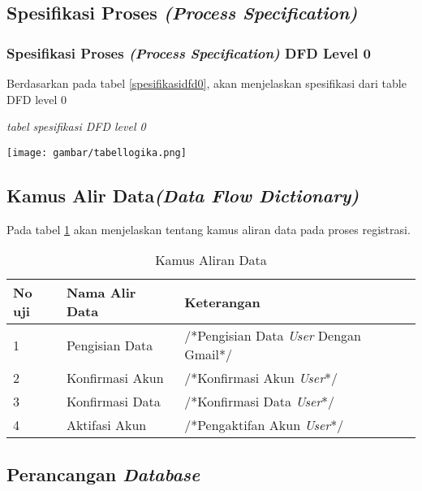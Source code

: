 \subsection{Spesifikasi Proses \textit{(Process Specification)}}
\subsubsection{Spesifikasi Proses \textit{(Process Specification)} DFD Level 0}
\par
Berdasarkan pada tabel \ref{spesifikasidfd0}, akan menjelaskan spesifikasi dari table DFD level 0
\begin{table}[!htbp]
\captionsetup{singlelinecheck=off}
      \caption{\textit{tabel spesifikasi DFD level 0}}
    \label{spesifikasidfd0}
    \texttt{[image: gambar/tabellogika.png]}
\end{table}


\subsection{Kamus Alir Data\textit{(Data Flow Dictionary)}}
\par
Pada tabel \ref{Kamus Aliran Data} akan menjelaskan tentang kamus aliran data pada proses registrasi.

\begin{table}[!htbp]
\captionsetup{singlelinecheck=off}
\caption{Kamus Aliran Data}
\label{Kamus Aliran Data}
\begin{tabular}{|l|l|l|}
\hline
\textbf{No uji} & \textbf{Nama Alir Data} & \textbf{Keterangan}                  \\ \hline
1               & Pengisian Data          & /*Pengisian Data \textit{User} Dengan Gmail*/ \\ \hline

2               & Konfirmasi Akun               & /*Konfirmasi Akun \textit{User}*/             \\ \hline
3               & Konfirmasi Data               & /*Konfirmasi Data \textit{User}*/             \\ \hline

4               & Aktifasi Akun           & /*Pengaktifan Akun \textit{User}*/          \\ \hline
\end{tabular}
\end{table}
\subsection{Perancangan \textit{Database}}
